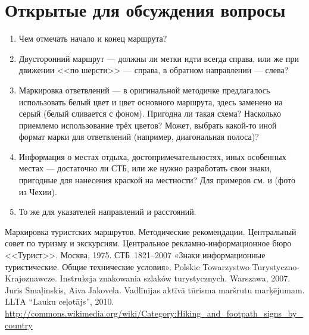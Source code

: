 \documentclass[a4paper,12pt,titlepage]{extarticle}
\begin{document}
\section{Открытые для обсуждения вопросы}
\begin{enumerate}
	\item Чем отмечать начало и конец маршрута?
	\item Двусторонний маршрут --- должны ли метки идти всегда справа, или же при движении <<по шерсти>> --- справа, в обратном направлении --- слева?
	\item Маркировка ответвлений --- в оригинальной методичке предлагалось использовать белый цвет и цвет основного маршрута, здесь заменено на серый (белый сливается с фоном). Пригодна ли такая схема? Насколько приемлемо использование трёх цветов? Может, выбрать какой-то иной формат марки для ответвлений (например, диагональная полоса)?
	\item Информация о местах отдыха, достопримечательностях, иных особенных местах --- достаточно ли СТБ, или же нужно разработать свои знаки, пригодные для нанесения краской на местности? Для примеров см. \cite{metodussr} и \cite{wikimedia-marks} (фото из Чехии).
	\item То же для указателей направлений и расстояний.
\end{enumerate}

\begin{thebibliography}{99}
	 Маркировка туристских маршрутов. Методические рекомендации. Центральный совет по туризму и
		экскурсиям. Центральное рекламно-информационное бюро <<Турист>>. Москва, 1975.
	 СТБ~1821--2007 «Знаки информационные туристические. Общие технические условия».
	 Polskie Towarzystwo Turystyczno-Krajoznawcze. Instrukcja znakowania szlaków turystycznych. Warszawa, 2007.
	\bibitem{} Juris Smaļinskis, Aiva Jakovela. Vadlīnijas aktīvā tūrisma maršrutu marķējumam. LLTA “Lauku ceļotājs”, 2010.
	 \url{http://commons.wikimedia.org/wiki/Category:Hiking\_and\_footpath\_signs\_by\_country}

\end{thebibliography}
\end{document}
